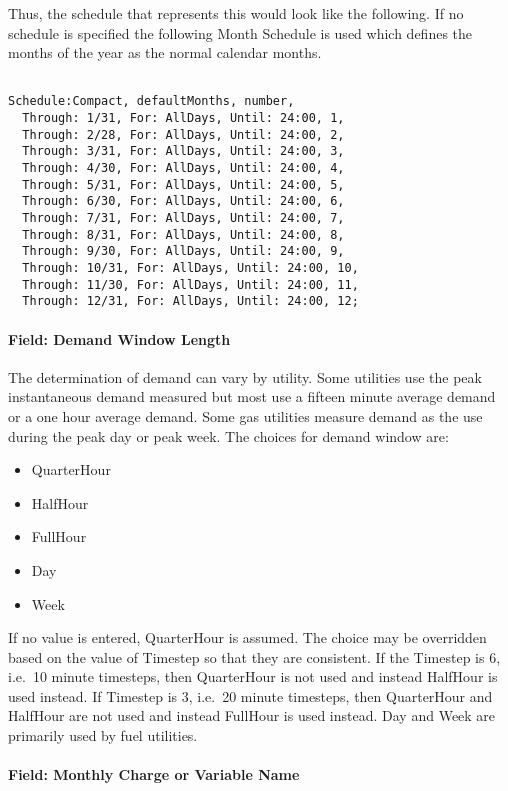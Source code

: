 Thus, the schedule that represents this would look like the following. If no schedule is specified the following Month Schedule is used which defines the months of the year as the normal calendar months.

\begin{lstlisting}

Schedule:Compact, defaultMonths, number,
  Through: 1/31, For: AllDays, Until: 24:00, 1,
  Through: 2/28, For: AllDays, Until: 24:00, 2,
  Through: 3/31, For: AllDays, Until: 24:00, 3,
  Through: 4/30, For: AllDays, Until: 24:00, 4,
  Through: 5/31, For: AllDays, Until: 24:00, 5,
  Through: 6/30, For: AllDays, Until: 24:00, 6,
  Through: 7/31, For: AllDays, Until: 24:00, 7,
  Through: 8/31, For: AllDays, Until: 24:00, 8,
  Through: 9/30, For: AllDays, Until: 24:00, 9,
  Through: 10/31, For: AllDays, Until: 24:00, 10,
  Through: 11/30, For: AllDays, Until: 24:00, 11,
  Through: 12/31, For: AllDays, Until: 24:00, 12;
\end{lstlisting}

\paragraph{Field: Demand Window Length}\label{field-demand-window-length-000}

The determination of demand can vary by utility. Some utilities use the peak instantaneous demand measured but most use a fifteen minute average demand or a one hour average demand. Some gas utilities measure demand as the use during the peak day or peak week. The choices for demand window are:

\begin{itemize}
\item
  QuarterHour
\item
  HalfHour
\item
  FullHour
\item
  Day
\item
  Week
\end{itemize}

If no value is entered, QuarterHour is assumed. The choice may be overridden based on the value of Timestep so that they are consistent. If the Timestep is 6, i.e.~10 minute timesteps, then QuarterHour is not used and instead HalfHour is used instead. If Timestep is 3, i.e.~20 minute timesteps, then QuarterHour and HalfHour are not used and instead FullHour is used instead. Day and Week are primarily used by fuel utilities.

\paragraph{Field: Monthly Charge or Variable Name}\label{field-monthly-charge-or-variable-name}


